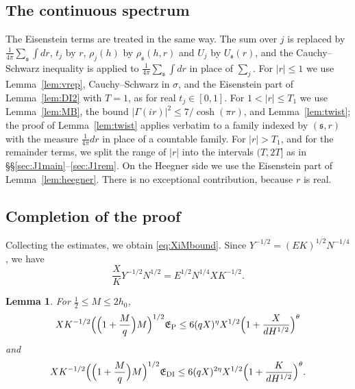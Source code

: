 \documentclass[11pt]{amsart}
\newtheorem{lemma}[theorem]{Lemma}
\theoremstyle{remark}
\theoremstyle{definition}
\numberwithin{equation}{section}
\newcommand{\gs}{\mathfrak{s}}
\begin{document}
\subsection{The continuous spectrum}
The Eisenstein terms are treated in the same way. The sum over $j$ is replaced by $\frac1{4\pi}\sum_\gs\int dr$, $t_j$ by $r$, $\rho_j(h)$ by $\rho_\gs(h,r)$ and $U_j$ by $U_\gs(r)$, and the Cauchy--Schwarz inequality is applied to $\frac1{4\pi}\sum_\gs\int dr$ in place of $\sum_j$. For $|r|\le1$ we use Lemma~\ref{lem:vrep}, Cauchy--Schwarz in $\sigma$, and the Eisenstein part of Lemma~\ref{lem:DI2} with $T=1$, as for real $t_j\in[0,1]$. For $1<|r|\le T_1$ we use Lemma~\ref{lem:MB}, the bound $|\Gamma(ir)|^2\le7/\cosh(\pi r)$, and Lemma~\ref{lem:twist}; the proof of Lemma~\ref{lem:twist} applies verbatim to a family indexed by $(\gs,r)$ with the measure $\frac1{4\pi}dr$ in place of a countable family. For $|r|>T_1$, and for the remainder terms, we split the range of $|r|$ into the intervals $(T,2T]$ as in \S\S\ref{sec:J1main}--\ref{sec:J1rem}. On the Heegner side we use the Eisenstein part of Lemma~\ref{lem:heegner}. There is no exceptional contribution, because $r$ is real.

\subsection{Completion of the proof}
Collecting the estimates, we obtain \eqref{eq:XiMbound}. Since $Y^{-1/2}=(EK)^{1/2}N^{-1/4}$, we have
\[
\frac XKY^{-1/2}N^{1/2}=E^{1/2}N^{1/4}XK^{-1/2}.
\]

\begin{lemma}\label{lem:Mopt}
For $\frac12\le M\le2h_0$,
\[
XK^{-1/2}\Bigl(\Bigl(1+\frac Mq\Bigr)M\Bigr)^{1/2}\mathfrak E_{\mathrm P}\le6(qX)^{\eta}X^{1/2}\Bigl(1+\frac X{dH^{1/2}}\Bigr)^\theta
\]
and
\[
XK^{-1/2}\Bigl(\Bigl(1+\frac Mq\Bigr)M\Bigr)^{1/2}\mathfrak E_{\mathrm{DI}}\le6(qX)^{2\eta}X^{1/2}\Bigl(1+\frac K{dH^{1/2}}\Bigr)^\theta.
\]
\end{lemma}
\end{document}
